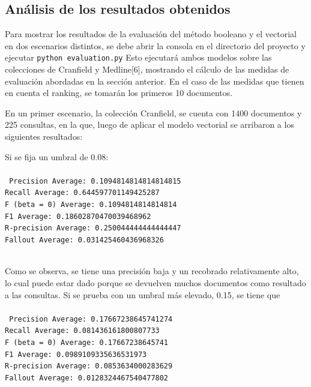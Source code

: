 \documentclass[twoside]{article}
\begin{document}
\subsection{An\'alisis de los resultados obtenidos}
\qquad Para mostrar los resultados de la evaluaci\'on del m\'etodo booleano y el vectorial en dos escenarios distintos, se debe abrir la consola en el directorio del proyecto y ejecutar \texttt{python evaluation.py} Esto ejecutar\'a ambos modelos sobre las colecciones de Cranfield y Medline[6], mostrando el c\'alculo de las medidas de evaluaci\'on abordadas en la secci\'on anterior. En el caso de las medidas que tienen en cuenta el ranking, se tomar\'an los primeros 10 documentos.

En un primer escenario, la colecci\'on Cranfield, se cuenta con 1400 documentos y 225 consultas, en la que, luego de aplicar el modelo vectorial se arribaron a los siguientes resultados:

Si se fija un umbral de 0.08:\\\\
\texttt{
Precision Average: 0.1094814814814814815 \\
Recall Average: 0.644597701149425287 \\
F (beta = 0) Average: 0.1094814814814814 \\
F1 Average: 0.18602870470039468962 \\
R-precision Average: 0.250044444444444447 \\
Fallout Average: 0.031425460436968326 \\\\
}

Como se observa, se tiene una precisi\'on baja y un recobrado relativamente alto, lo cual puede estar dado porque se devuelven muchos documentos como resultado a las consultas. Si se prueba con un umbral m\'as elevado, 0.15, se tiene que\\\\
\texttt{
Precision Average: 0.17667238645741274 \\
Recall Average: 0.081436161800807733 \\
F (beta = 0) Average: 0.17667238645741 \\
F1 Average: 0.0989109335636531973 \\
R-precision Average: 0.0853634000283629 \\
Fallout Average: 0.0128324467540477802 \\\\
}
\end{document}
